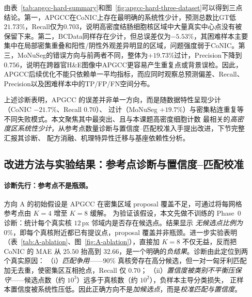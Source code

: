 由表~\ref{tab:apgcc-hard-summary}和图~\ref{fig:apgcc-hard-three-dataset}可以得到三点结论。第一，APGCC在CoNIC上存在最明确的系统性少计，预测总数比GT低$21.73\%$，Recall仅为$0.703$，说明高密度结肠细胞核区域中大量真实中心点没有被保留下来。第二，BCData同样存在少计，但总误差仅为$-5.53\%$，其困难样本主要集中在局部密集重叠和阳性/阴性外观差异明显的区域，问题强度弱于CoNIC。第三，MoNuSeg的错误方向与前两者不同，整体为$+19.73\%$过计，Precision下降到$0.756$，说明在跨器官H\&E图像中APGCC更容易产生重复点或背景误检。因此，APGCC后续优化不能只依赖单一平均指标，而应同时观察总预测偏差、Recall、Precision以及困难样本中的TP/FP/FN空间分布。

上述诊断表明，APGCC 的误差并非单一方向，而是随数据特性呈现少计（CoNIC $-21.7\%$、Recall $0.70$）、
过计（MoNuSeg $+19.7\%$）与密集粘连重复等不同失败模式。本文聚焦其中最突出、且与本课题高密度细胞计数
最相关的\emph{高密度区系统性少计}，从参考点数量诊断与置信度--匹配校准入手提出改进，下节完整汇报其诊断、
配方消融、机理特异性迁移与基座依赖性分析。

\subsection{改进方法与实验结果：参考点诊断与置信度--匹配校准}

\paragraph{诊断先行：参考点不是瓶颈。}
方向 A 的初始假设是 APGCC 在密集区域 proposal 覆盖不足，可通过将每网格参考点由 $K{=}4$ 增至 $K{=}8$ 缓解。
为验证该假设，本文先做不训练的 Phase~0 诊断：统计每个真实核 $12$\,px 邻域内是否存在候选点。结果显示
\emph{无候选点比例为 $0\%$}，即每个真核附近都已有提议点，proposal 覆盖并非瓶颈。进一步实验表明
（表~\ref{tab:A-ablation}、图~\ref{fig:A-ablation}），直接加 $K{=}8$ 不仅无益，反而把 CoNIC 的 MAE
从 $25.50$ 抬高到 $32.66$，是一个明确的\emph{负结果}。诊断由此定位到两个真实原因：
（i）\emph{匹配争用}——$90\%$ 真核旁存在高分候选，但一对一匈牙利匹配加无去重，使密集区互相抢点，Recall 仅 $0.70$；
（ii）\emph{置信度被类别不平衡压保守}——候选点数（约 $10^3$）远多于真核数（约 $10^2$），负样本主导分类损失，
正样本置信度被系统性压低。因此正确方向不是\emph{加候选点}，而是\emph{校准匹配与置信度}。

